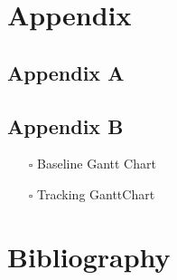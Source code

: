 \documentclass[12pt,a4paper,man]{report}
\begin{document}
\part{Appendix}
\label{sec:org1c3e97f}
\chapter{Appendix A}
\label{sec:orge3988cf}

\chapter{Appendix B}
\label{sec:org9d4d1d5}

\begin{itemize}
\item[{$\square$}] Baseline Gantt Chart
\item[{$\square$}] Tracking GanttChart
\end{itemize}
\part{Bibliography}
\label{sec:orgb35a08d}

\printglossaries



\end{document}
